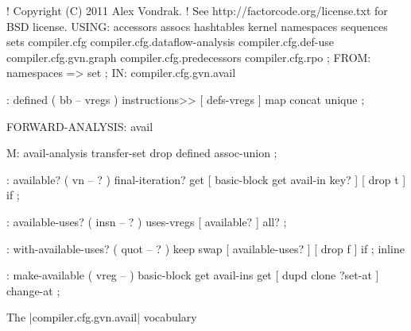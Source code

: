 \centering

  \begin{factorcode}
    ! Copyright (C) 2011 Alex Vondrak.
    ! See http://factorcode.org/license.txt for BSD license.
    USING: accessors assocs hashtables kernel namespaces sequences
    sets
    compiler.cfg
    compiler.cfg.dataflow-analysis
    compiler.cfg.def-use
    compiler.cfg.gvn.graph
    compiler.cfg.predecessors
    compiler.cfg.rpo ;
    FROM: namespaces => set ;
    IN: compiler.cfg.gvn.avail

    : defined ( bb -- vregs )
        instructions>> [ defs-vregs ] map concat unique ;

    FORWARD-ANALYSIS: avail

    M: avail-analysis transfer-set drop defined assoc-union ;

    : available? ( vn -- ? )
        final-iteration? get [
            basic-block get avail-in key?
        ] [ drop t ] if ;

    : available-uses? ( insn -- ? )
        uses-vregs [ available? ] all? ;

    : with-available-uses? ( quot -- ? )
        keep swap [ available-uses? ] [ drop f ] if ; inline

    : make-available ( vreg -- )
        basic-block get avail-ins get [ dupd clone ?set-at ] change-at ;
  \end{factorcode}

\caption{The \factor|compiler.cfg.gvn.avail| vocabulary}
